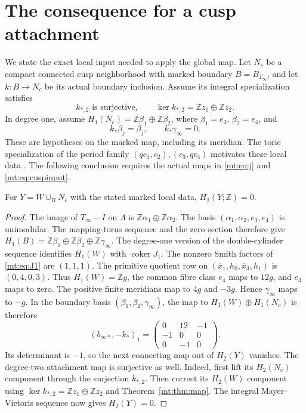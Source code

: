 \section{The consequence for a cusp attachment}

We state the exact local input needed to apply the global map.
Let $N_c$ be a compact connected cusp neighborhood with marked boundary
$B=B_{T_\infty}$, and let $k:B\to N_c$ be its actual boundary inclusion.
Assume its integral specialization satisfies
\begin{equation}\label{mt:eq:cuspinput}
k_{*,2}\text{ is surjective},\qquad
\ker k_{*,2}=\mathbb Zz_1\oplus\mathbb Zz_2.
\end{equation}
In degree one, assume $H_1(N_c)=\mathbb Z\beta_1\oplus\mathbb Z\beta_2$,
where $\beta_1=e_3$, $\beta_2=e_4$, and
\[
k_*\beta_j=\beta_j,\qquad k_*\gamma_\infty=0.
\]
These are hypotheses on the marked map, including its meridian.
The toric specialization of the period family
$(qc_1,c_2),(c_3,qc_4)$ motivates these local data
\cite[Propositions 2.7--2.9]{MTengel}.
The following conclusion requires the actual maps in
\eqref{mt:eq:j} and \eqref{mt:eq:cuspinput}.

\begin{corollary}\label{mt:cor:H2}
For $Y=W\cup_BN_c$ with the stated marked local data,
$H_2(Y;\mathbb Z)=0$.
\end{corollary}
\begin{proof}
The image of $T_\infty-I$ on $\Lambda$ is
$\mathbb Z\alpha_1\oplus\mathbb Z\alpha_2$.
The basis $(\alpha_1,\alpha_2,e_3,e_4)$ is unimodular.
The mapping-torus sequence and the zero section therefore give
$H_1(B)=\mathbb Z\beta_1\oplus\mathbb Z\beta_2\oplus\mathbb Z\gamma_\infty$.
The degree-one version of the double-cylinder sequence identifies $H_1(W)$
with $\operatorname{coker}J_1$.
The nonzero Smith factors of \eqref{mt:eq:J1} are $(1,1,1)$.
The primitive quotient row on
$(\overline x_1,h_0,\overline x_3,h_1)$ is $(0,4,0,3)$.
Thus $H_1(W)=\mathbb Zg$, the common fibre class $e_4$ maps to $12g$,
and $e_3$ maps to zero.
The positive finite meridians map to $4g$ and $-3g$.
Hence $\gamma_\infty$ maps to $-g$.
In the boundary basis $(\beta_1,\beta_2,\gamma_\infty)$, the map to
$H_1(W)\oplus H_1(N_c)$ is therefore
\begin{equation}\label{mt:eq:one}
(b_{\infty*},-k_*)_1=
\begin{pmatrix}0&12&-1\\-1&0&0\\0&-1&0\end{pmatrix}.
\end{equation}
Its determinant is $-1$, so the next connecting map out of $H_2(Y)$ vanishes.
The degree-two attachment map is surjective as well.
Indeed, first lift its $H_2(N_c)$ component through the surjection $k_{*,2}$.
Then correct its $H_2(W)$ component using
$\ker k_{*,2}=\mathbb Zz_1\oplus\mathbb Zz_2$ and Theorem~\ref{mt:thm:map}.
The integral Mayer--Vietoris sequence now gives $H_2(Y)=0$.
\end{proof}

